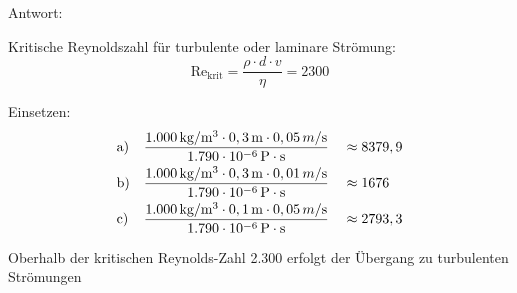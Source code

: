 \documentclass[a4paper,10pt]{article}
\newcommand{\answ}{{\color{miugray2}Antwort: \par \vspace*{-3mm} 
\hrulefill }\par }
\begin{document}
\answ

Kritische Reynoldszahl für turbulente oder laminare Strömung:
\begin{equation}
\text{Re}_{\text{krit}} = \frac{\rho \cdot d \cdot v}{\eta} = 2300
\end{equation}
\reversemarginpar
{}

Einsetzen:
\begin{align*}
&\text{a)} && \frac{1.000\mskip3mu \text{kg}/\text{m}^3 \cdot 0,3\mskip3mu \text{m} \cdot 0,05\mskip3mu m/\text{s}}{1.790 \cdot 10^{-6}\mskip3mu \text{P} \cdot \text{s}} &&\approx 8379,9 \\
&\text{b)} && \frac{1.000\mskip3mu \text{kg}/\text{m}^3 \cdot 0,3\mskip3mu \text{m} \cdot 0,01\mskip3mu m/\text{s}}{1.790 \cdot 10^{-6}\mskip3mu \text{P} \cdot \text{s}} &&\approx 1676 \\
&\text{c)} && \frac{1.000\mskip3mu \text{kg}/\text{m}^3 \cdot 0,1\mskip3mu \text{m} \cdot 0,05\mskip3mu m/\text{s}}{1.790 \cdot 10^{-6}\mskip3mu \text{P} \cdot \text{s}} &&\approx 2793,3 \\
\end{align*}

Oberhalb der kritischen Reynolds-Zahl 2.300 erfolgt der Übergang zu turbulenten Strömungen








\end{document}

